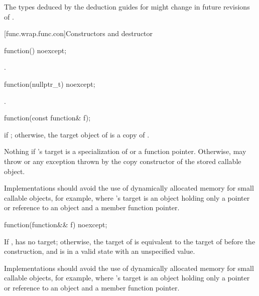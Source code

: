 \pnum
\begin{note}
The types deduced by the deduction guides for 
might change in future revisions of \Cpp{}.
\end{note}

[func.wrap.func.con]{Constructors and destructor}

%
\begin{itemdecl}
function() noexcept;
\end{itemdecl}

\begin{itemdescr}
\pnum
\ensures
{}.
\end{itemdescr}

%
\begin{itemdecl}
function(nullptr_t) noexcept;
\end{itemdecl}

\begin{itemdescr}
\pnum
\ensures
{}.
\end{itemdescr}

%
\begin{itemdecl}
function(const function& f);
\end{itemdecl}

\begin{itemdescr}
\pnum
\ensures
{} if ; otherwise,
the target object of  is a copy of .

\pnum
\throws
Nothing if 's target is
a specialization of  or
a function pointer. Otherwise, may throw 
or any exception thrown by the copy constructor of the stored callable object.

\pnum
\recommended
Implementations should avoid the use of
dynamically allocated memory for small callable objects, for example, where
's target is an object holding only a pointer or reference
to an object and a member function pointer.
\end{itemdescr}

%
\begin{itemdecl}
function(function&& f) noexcept;
\end{itemdecl}

\begin{itemdescr}
\pnum
\ensures
If ,  has no target;
otherwise, the target of  is equivalent to
the target of  before the construction, and
 is in a valid state with an unspecified value.

\pnum
\recommended
Implementations should avoid the use of
dynamically allocated memory for small callable objects, for example,
where 's target is an object holding only a pointer or reference
to an object and a member function pointer.
\end{itemdescr}

